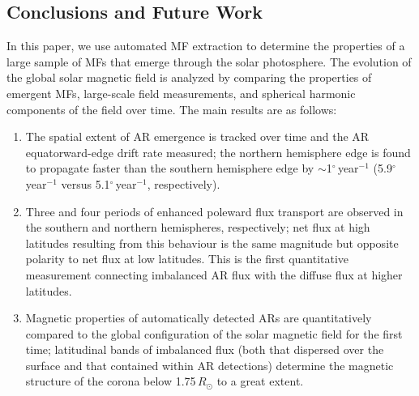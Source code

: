 \documentclass[namedreferences]{solarphysics}
\newcommand{\degr}{\ensuremath{^\circ}}
\begin{document}
\begin{article}
\section{Conclusions and Future Work}\label{discussion}

In this paper, we use automated MF extraction to determine the properties of a large sample of MFs that emerge through the solar photosphere. The evolution of the global solar magnetic field is analyzed by comparing the properties of emergent MFs, large-scale field measurements, and spherical harmonic components of the field over time.  The main results are as follows: 
\begin{enumerate}

\item The spatial extent of AR emergence is tracked over time and the AR equatorward-edge drift rate measured; the northern hemisphere edge is found to propagate faster than the southern hemisphere edge by $\sim$1\degr\,year$^{-1}$ (5.9\degr\,year$^{-1}$ versus 5.1\degr\,year$^{-1}$, respectively).

\item Three and four periods of enhanced poleward flux transport are observed in the southern and northern hemispheres, respectively; net flux at high latitudes resulting from this behaviour is the same magnitude but opposite polarity to net flux at low latitudes. This is the first quantitative measurement connecting imbalanced AR flux with the diffuse flux at higher latitudes.

\item Magnetic properties of automatically detected ARs are quantitatively compared to the global configuration of the solar magnetic field for the first time; latitudinal bands of imbalanced flux (both that dispersed over the surface and that contained within AR detections) determine the magnetic structure of the corona below 1.75\,$R_{\odot}$ to a great extent. 




\end{enumerate}
\end{article}
\end{document}
